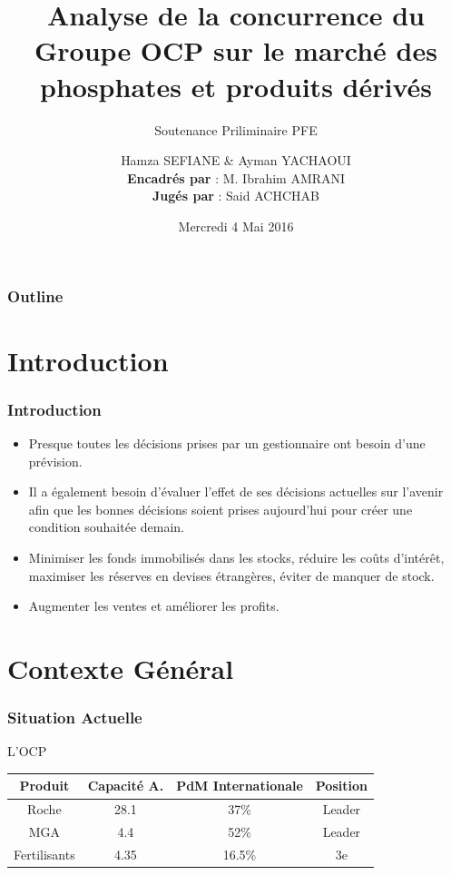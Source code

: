 \documentclass{beamer}
\title[ENSIAS - Business Intelligence]{
  Analyse de la concurrence du Groupe OCP sur le marché des phosphates et produits dérivés}
\subtitle{\tiny{Soutenance Priliminaire PFE}}
\author[SEFIANE \& YACHAOUI]{
  Hamza SEFIANE \& Ayman YACHAOUI \\\medskip
  {\small \textbf{Encadrés par} : M. Ibrahim AMRANI} \\ 
  {\small \textbf{Jugés par} : Said ACHCHAB}}
\institute[]{
  École Nationale Supérieure d'Informatique et d'Analyse des Systèmes}
\date[Année universitaire 2015-2016]{
  Mercredi 4 Mai 2016}
\begin{document}
\begin{frame}
  \titlepage
\end{frame}

\begin{frame}
  \frametitle{Outline}

  \tableofcontents
\end{frame}

\section{Introduction}

\begin{frame}
  \frametitle{Introduction}

  \begin{itemize}
    \item Presque toutes les décisions prises par un gestionnaire ont besoin d'une prévision.
    \item Il a également besoin d'évaluer l'effet de ses décisions actuelles sur l'avenir afin que les bonnes décisions soient prises aujourd'hui pour créer une condition souhaitée demain.
    \item Minimiser les fonds immobilisés dans les stocks, réduire les coûts d'intérêt, maximiser les réserves en devises étrangères, éviter de manquer de stock.
    \item Augmenter les ventes et améliorer les profits.
  \end{itemize}
\end{frame}

\section{Contexte Général}
\begin{frame}
\frametitle{Situation Actuelle}
\begin{block}{L'OCP}
\begin{table}
\centering 
  \begin{tabular}{|c|c|c|c|}
  \hline
  \small{Produit} & \small{Capacité A.} & \small{PdM Internationale} & \small{Position} \\
  \hline
  Roche & 28.1 & 37\% & Leader\\
  MGA & 4.4 & 52\% & Leader\\
  Fertilisants & 4.35 & 16.5\% & 3e\\
  \hline
  \end{tabular}
  \end{table}
  \end{block} 
\end{frame}
\end{document}
